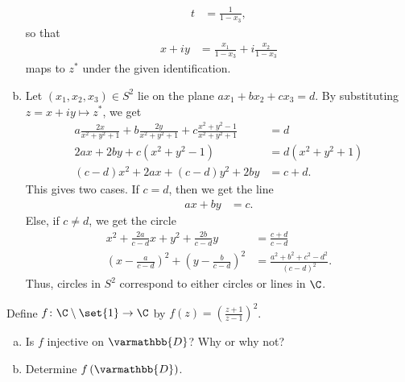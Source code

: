 \documentclass[10pt]{mypackage}
\renewcommand*{\mathbb}[1]{\varmathbb{#1}}
\begin{document}
\begin{solution}
\begin{enumerate}[(a)]
\begin{align*}
        t &= \frac{1}{1-x_3},
      \end{align*}
      so that
      \begin{align*}
        x+iy &= \frac{x_1}{1-x_3} + i\frac{x_2}{1-x_3}
      \end{align*}
      maps to $z^{\ast}$ under the given identification.
    \item Let $\left( x_1,x_2,x_3 \right)\in S^{2}$ lie on the plane $ax_1 + bx_2 + cx_3 = d$. By substituting $z = x+ iy \mapsto z^{\ast}$, we get
      \begin{align*}
        a \frac{2x}{x^2 + y^2 + 1} + b\frac{2y}{x^2 + y^2 + 1} + c \frac{x^2 + y^2 - 1}{x^2 + y^2 + 1} &= d\\
        2ax + 2by + c\left( x^2 + y^2 - 1 \right) &= d\left( x^2 + y^2 + 1 \right)\\
        \left( c-d \right)x^2 + 2ax + \left( c-d \right)y^2 + 2by &= c + d.
      \end{align*}
      This gives two cases. If $c = d$, then we get the line
      \begin{align*}
        ax + by &= c.
      \end{align*}
      Else, if $c \neq d$, we get the circle
      \begin{align*}
        x^2 + \frac{2a}{c-d}x + y^2 + \frac{2b}{c-d}y &= \frac{c+d}{c-d}\\
        \left( x-\frac{a}{c-d} \right)^2 + \left( y - \frac{b}{c-d} \right)^2 &= \frac{a^2 + b^2 + c^2 - d^2}{\left( c-d \right)^2}.
      \end{align*}
      Thus, circles in $S^{2}$ correspond to either circles or lines in $\C$.
  \end{enumerate}
\end{solution}
\begin{problem}[Problem 2]
  Define $f\colon \C\setminus \set{1}\rightarrow \C$ by $f(z) = \left( \frac{z+1}{z-1} \right)^2$.
  \begin{enumerate}[(a)]
    \item Is $f$ injective on $ \mathbb{D} $? Why or why not?
    \item Determine $f\left( \mathbb{D} \right)$.
  \end{enumerate}
\end{problem}
\end{document}
